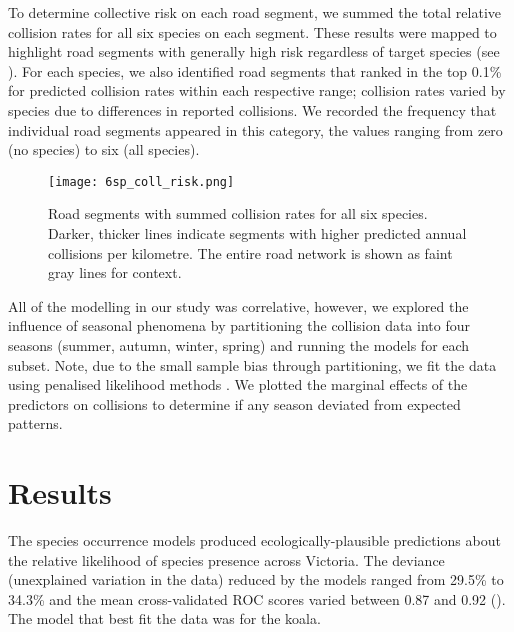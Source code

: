 To determine collective risk on each road segment, we summed the total relative collision rates for all six species on each segment.  These results were mapped to highlight road segments with generally high risk regardless of target species (see ). For each species, we also identified road segments that ranked in the top 0.1\% for predicted collision rates within each respective range; collision rates varied by species due to differences in reported collisions. We recorded the frequency that individual road segments appeared in this category, the values ranging from zero (no species) to six (all species).

\begin{figure*}[!h]
  \centering
  \texttt{[image: 6sp\_coll\_risk.png]}
  \caption[Road segments with predictions of high collision likelihood for six mammal species]{Road segments with summed collision rates for all six species. Darker, thicker lines indicate segments with higher predicted annual collisions per kilometre. The entire road network is shown as faint gray lines for context.}
  \label{6sp_collrisk}
\end{figure*}

All of the modelling in our study was correlative, however, we explored the influence of seasonal phenomena by partitioning the collision data into four seasons (summer, autumn, winter, spring) and running the models for each subset. Note, due to the small sample bias through partitioning, we fit the data using penalised likelihood methods \citep[see][]{firt93}.  We plotted the marginal effects of the predictors on collisions to determine if any season deviated from expected patterns.

\section{Results}

The species occurrence models produced ecologically-plausible predictions about the relative likelihood of species presence across Victoria. The deviance (unexplained variation in the data) reduced by the models ranged from 29.5\% to 34.3\% and the mean cross-validated ROC scores varied between 0.87 and 0.92 (). The model that best fit the data was for the koala. 

